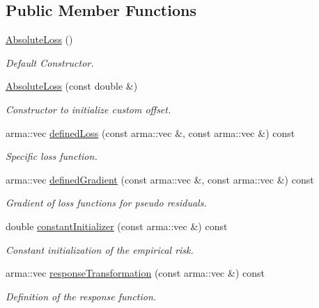 \subsection*{Public Member Functions}
\begin{DoxyCompactItemize}
\item 
\hyperlink{classloss_1_1_absolute_loss_a4b1416147d0573079f9d652097c1ab81}{Absolute\+Loss} ()
\begin{DoxyCompactList}\small\item\em Default Constructor. \end{DoxyCompactList}\item 
\hyperlink{classloss_1_1_absolute_loss_a3e056fbde0b63527bb9aadb0a4a8547a}{Absolute\+Loss} (const double \&)
\begin{DoxyCompactList}\small\item\em Constructor to initialize custom offset. \end{DoxyCompactList}\item 
arma\+::vec \hyperlink{classloss_1_1_absolute_loss_acfef6f0de3cfcccebd4bbfc04133cf1e}{defined\+Loss} (const arma\+::vec \&, const arma\+::vec \&) const
\begin{DoxyCompactList}\small\item\em Specific loss function. \end{DoxyCompactList}\item 
arma\+::vec \hyperlink{classloss_1_1_absolute_loss_a1886fc8ca065c6f0a207b7a8a0f8444d}{defined\+Gradient} (const arma\+::vec \&, const arma\+::vec \&) const
\begin{DoxyCompactList}\small\item\em Gradient of loss functions for pseudo residuals. \end{DoxyCompactList}\item 
double \hyperlink{classloss_1_1_absolute_loss_aa2ac5fb1fdf3ce0f48decd77d375ef76}{constant\+Initializer} (const arma\+::vec \&) const
\begin{DoxyCompactList}\small\item\em Constant initialization of the empirical risk. \end{DoxyCompactList}\item 
arma\+::vec \hyperlink{classloss_1_1_absolute_loss_aa7e0ac902d905ae97f9e2d0337c6c058}{response\+Transformation} (const arma\+::vec \&) const
\begin{DoxyCompactList}\small\item\em Definition of the response function. \end{DoxyCompactList}\end{DoxyCompactItemize}
